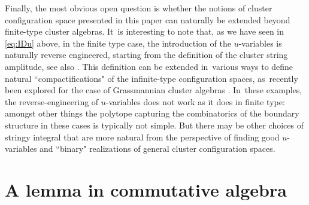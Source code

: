 \documentclass[10pt,a4paper]{amsart}
\numberwithin{equation}{section}
\begin{document}
\bigskip{}
Finally, the most obvious open question is whether the notions of cluster configuration space presented in this paper can naturally be extended beyond finite-type cluster algebras. It~is interesting to note that, as we have seen in \eqref{eq:IDu} above, in the finite type case, the introduction of the $u$-variables is naturally reverse engineered, starting from the definition of the cluster string amplitude, see also \cite{AHL}. This definition can be extended in~various ways to define natural ``compactifications" of the infinite-type configuration spaces, as~recently been explored for the case of Grassmannian cluster algebras \cite{ALS}. In~these examples, the reverse-engineering of $u$-variables does not work as it does in finite type: amongst other things the polytope capturing the combinatorics of the boundary structure in these cases is typically not simple. But there may be other choices of stringy integral that are more natural from the perspective of finding good $u$-variables and ``binary" realizations of general cluster configuration spaces.

\appendix

\section{A lemma in commutative algebra}
\end{document}
